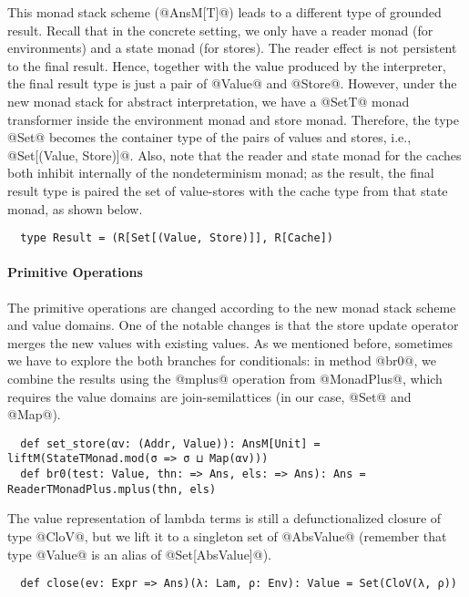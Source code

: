 This monad stack scheme (@AnsM[T]@) leads to a different type of grounded
result. Recall that in the concrete setting, we only have a reader monad (for
environments) and a state monad (for stores). The reader effect is not
persistent to the final result. Hence, together with the value produced by the
interpreter, the final result type is just a pair of @Value@ and @Store@.
However, under the new monad stack for abstract interpretation, we have a
@SetT@ monad transformer inside the environment monad and store monad. Therefore, the type
@Set@ becomes the container type of the pairs of values and stores, i.e.,
@Set[(Value, Store)]@.  Also, note that the reader and state monad for the
caches both inhibit internally of the nondeterminism monad; as the result, the
final result type is paired the set of value-stores with the cache type from
that state monad, as shown below.
\begin{lstlisting}
  type Result = (R[Set[(Value, Store)]], R[Cache])
\end{lstlisting}

\paragraph{Primitive Operations} The primitive operations are changed according
to the new monad stack scheme and value domains. One of the notable changes is
that the store update operator merges the new values with existing values.  As
we mentioned before, sometimes we have to explore the both branches for
conditionals: in method @br0@, we combine the results using the @mplus@
operation from @MonadPlus@, which requires the value domains are
join-semilattices (in our case, @Set@ and @Map@).
\begin{lstlisting}
  def set_store(αv: (Addr, Value)): AnsM[Unit] = liftM(StateTMonad.mod(σ => σ ⊔ Map(αv)))
  def br0(test: Value, thn: => Ans, els: => Ans): Ans = ReaderTMonadPlus.mplus(thn, els)
\end{lstlisting}

The value representation of lambda terms is still a defunctionalized closure of
type @CloV@, but we lift it to a singleton set of @AbsValue@ (remember that
type @Value@ is an alias of @Set[AbsValue]@).
\begin{lstlisting}
  def close(ev: Expr => Ans)(λ: Lam, ρ: Env): Value = Set(CloV(λ, ρ))
\end{lstlisting}

